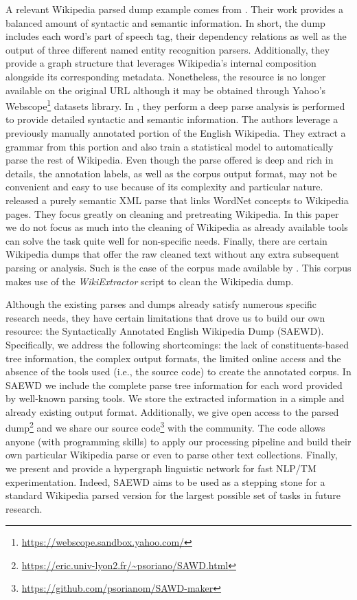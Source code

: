 A relevant Wikipedia parsed dump example comes from \cite{ATSERIAS08}. Their work provides a balanced amount of syntactic and semantic information. In short, the dump includes each word's part of speech tag, their dependency relations as well as the output of three different named entity recognition parsers. Additionally, they provide a graph structure that leverages Wikipedia's internal composition alongside its corresponding metadata. Nonetheless, the resource is no longer available on the original URL although it may be obtained through Yahoo's Webscope\footnote{\url{https://webscope.sandbox.yahoo.com/}} datasets library.  In \cite{FLICKINGER10}, they perform a deep parse analysis is performed to provide detailed syntactic and semantic information. The authors leverage a previously manually annotated portion of the English Wikipedia. They extract a grammar from this portion and also train a statistical model  to automatically parse the rest of Wikipedia. Even though the parse offered is deep and rich in details, the annotation labels, as well as the corpus output format, may not be convenient and easy to use because of its complexity and particular nature. \cite{SchenkelSK07}  released a purely semantic XML parse that links WordNet concepts to Wikipedia pages. They focus greatly on cleaning and pretreating Wikipedia. In this paper we do not focus as much into the cleaning of Wikipedia as already available tools can solve the task quite well for non-specific needs. 
Finally, there are certain Wikipedia dumps that offer the raw cleaned text without any extra subsequent parsing or analysis. Such is the case of the corpus made available by \cite{westbury2010}. This corpus makes  use of the \textit{WikiExtractor} script  \cite{Attardi2015} to clean the Wikipedia dump.
  
  
Although the existing parses and dumps already satisfy numerous specific research needs, they have certain limitations that drove us to build our own resource: the Syntactically Annotated English Wikipedia  Dump (SAEWD). Specifically, we address the following shortcomings: the lack of constituents-based tree information, the complex output formats, the limited online access and the absence of the tools used (i.e., the source code) to create the annotated corpus. In SAEWD we include the complete parse tree information for each word provided by well-known parsing tools. We store the extracted information in a simple and already existing output format. Additionally, we give open access to the parsed dump\footnote{\url{https://eric.univ-lyon2.fr/~psoriano/SAWD.html}} and we share our source code\footnote{\url{https://github.com/psorianom/SAWD-maker}} with the community. The code allows anyone (with programming skills) to  apply our processing pipeline and build their own particular Wikipedia parse or even to parse other text collections. Finally, we present and provide a hypergraph linguistic network for fast NLP/TM experimentation. Indeed, SAEWD aims to be used as a stepping stone for a standard Wikipedia parsed version for the largest possible set of tasks in future research. 

